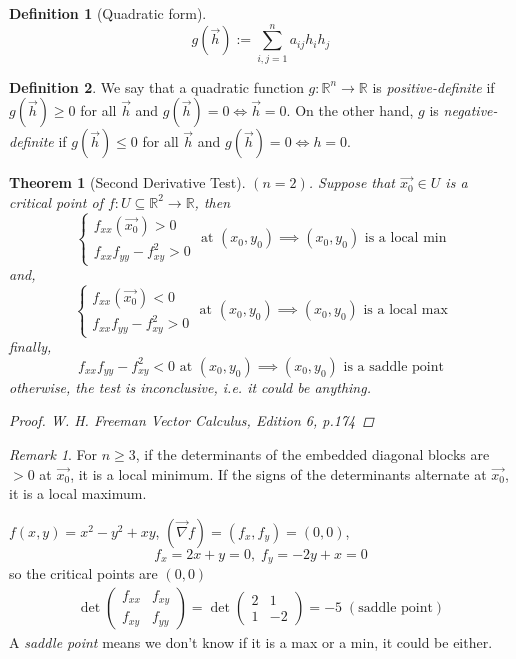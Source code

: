 \documentclass[12pt]{book}
\newtheorem{theorem}{Theorem}[section]
\theoremstyle{definition}
\newtheorem{definition}{Definition}[section]
\theoremstyle{remark}
\newtheorem*{remark}{Remark}
\begin{document}
  \begin{definition}[Quadratic form]
    $$g(\vec{{h}}) := \sum^{n}_{i,j = 1} a_{ij} h_ih_j$$
  \end{definition}
  \begin{definition} We say that a quadratic function $g: \mathbb{R}^n \to \mathbb{R}$ is \textit{positive-definite} if $g(\vec{{h}} ) \geq 0$ for all $\vec{{h}} {}$  and $g(\vec{{h}} ) = 0 \iff \vec{h} = 0$. On the other hand, $g$ is  \textit{negative-definite} if $g(\vec{{h}}) \leq 0$ for all $\vec{{h}}$ and $g(\vec{{h}}) = 0 \iff h =0$. 
  
  \end{definition}
  \begin{theorem} [Second Derivative Test]
    $(n=2)$. Suppose that $\vec{{x_0}} \in U$ is a critical point of $f: U \subseteq \mathbb{R}^2 \to \mathbb{R}$, then  $$\left\{\begin{matrix} f_{xx} (\vec{x_0}) > 0  \\ f_{xx} f_{yy} - f_{xy}^2 >0
    \end{matrix}\right. \text{ at } (x_0, y_0) \implies (x_0,y_0) \text{  is a local min} $$
    and,
$$\left\{\begin{matrix} f_{xx} (\vec{{x_0}}) < 0  \\ f_{xx} f_{yy} - f_{xy}^2 >0
    \end{matrix}\right. \text{ at } (x_0, y_0) \implies (x_0,y_0) \text{  is a local max} $$
    finally,
$$ f_{xx} f_{yy} - f_{xy}^2 <0 \text{ at } (x_0, y_0) \implies (x_0,y_0) \text{  is a saddle point} $$
otherwise, the test is inconclusive, i.e. it could be anything.
\begin{proof} 
  W. H. Freeman Vector Calculus, Edition 6, p.174
\end{proof}
  \end{theorem}
  \begin{remark}
    For $n\geq 3$, if the determinants of the embedded diagonal blocks are $> 0$ at $\vec{{x_0}}$, it is a local minimum. If the signs of the determinants alternate at $\vec{{x_0}} $, it is a local maximum. 
  \end{remark}
  \begin{example} $f(x,y) = x^2- y^2 + xy$, $(\vec{{\nabla }} f) = (f_x, f_y) = (0,0 )$,
    $$f_x = 2x + y = 0 , \; f_y = -2y+ x = 0   $$
    so the critical points are $(0,0)$ 
    \begin{equation*}
      \begin{split}
      \det \begin{pmatrix}
        f_{xx} & f_{xy} \\ f_{xy} & f_{yy} 
      \end{pmatrix} = \det \begin{pmatrix}
        2 & 1 \\ 1 & -2
      \end{pmatrix} = -5 \; (\text{saddle point})
      \end{split}
    \end{equation*}
    A \textit{saddle point} means we don't know if it is a max or a min, it could be either. 
  \end{example}
\end{document}
